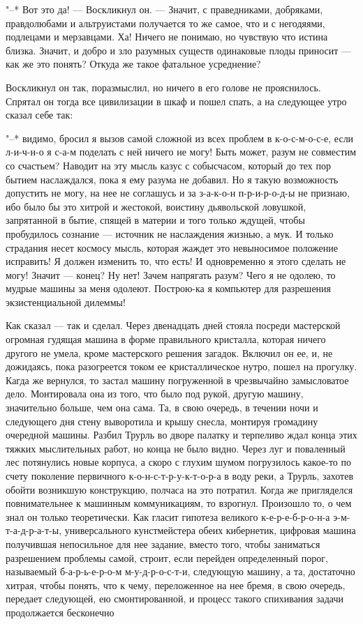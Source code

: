 "--* Вот это да! --- Воскликнул он. --- Значит, с
праведниками, добряками, правдолюбами и альтруистами
получается то же самое, что и с негодяями, подлецами и
мерзавцами. Ха! Ничего не понимаю, но чувствую что истина
близка. Значит, и добро и зло разумных существ одинаковые
плоды приносит --- как же это понять? Откуда же такое
фатальное усреднение?

Воскликнул он так, поразмыслил, но ничего в его голове не
прояснилось. Спрятал он тогда все цивилизации в шкаф и пошел
спать, а на следующее утро сказал себе так:

"--* видимо, бросил я вызов самой сложной из всех проблем в
к-о-с-м-о-с-е, если л-и-ч-н-о я с-а-м поделать с ней ничего
не могу! Быть может, разум не совместим со счастьем? Наводит
на эту мысль казус с собысчасом, который до тех пор бытием
наслаждался, пока я ему разума не добавил. Но я такую
возможность допустить не могу, на нее не соглашусь и за
з-а-к-о-н п-р-и-р-о-д-ы не признаю, ибо было бы это хитрой и
жестокой, воистину дьявольской ловушкой, запрятанной в
бытие, спящей в материи и того только ждущей, чтобы
пробудилось сознание --- источник не наслаждения жизнью, а
мук. И только страдания несет космосу мысль, которая жаждет
это невыносимое положение исправить! Я должен изменить то,
что есть! И одновременно я этого сделать не могу! Значит --- конец?
Ну нет! Зачем напрягать разум? Чего я не одолею, то
мудрые машины за меня одолеют. Построю-ка я компьютер для
разрешения экзистенциальной дилеммы!

Как сказал --- так и сделал. Через двенадцать дней стояла
посреди мастерской огромная гудящая машина в форме
правильного кристалла, которая ничего другого не умела,
кроме мастерского решения загадок. Включил он ее, и, не
дожидаясь, пока разогреется током ее кристаллическое нутро,
пошел на прогулку. Кагда же вернулся, то застал машину
погруженной в чрезвычайно замысловатое дело. Монтировала она
из того, что было под рукой, другую машину, значительно
больше, чем она сама. Та, в свою очередь, в течении ночи и
следующего дня стену выворотила и крышу снесла, монтируя
громадину очередной машины. Разбил Трурль во дворе палатку и
терпеливо ждал конца этих тяжких мыслительных работ, но
конца не было видно. Через луг и поваленный лес потянулись
новые корпуса, а скоро с глухим шумом погрузилось какое-то
по счету поколение первичного к-о-н-с-т-р-у-к-т-о-р-а в воду
реки, а Трурль, захотев обойти возникшую конструкцию,
полчаса на это потратил. Когда же пригляделся повнимательнее
к машинным коммуникациям, то взрогнул. Произошло то, о чем
знал он только теоретически. Как гласит гипотеза великого
к-е-р-е-б-р-о-н-а э-м-т-а-д-р-а-т-ы, универсального
кунстмейстера обеих кибернетик, цифровая машина получившая
непосильное для нее задание, вместо того, чтобы заниматься
разрешением проблемы самой, строит, если перейден
определенный порог, называемый б-а-р-ь-е-р-о-м
м-у-д-р-о-с-т-и, следующую машину, а та, достаточно хитрая,
чтобы понять, что к чему, переложенное на нее бремя, в свою
очередь, передает следующей, ею смонтированной, и процесс
такого спихивания задачи продолжается бесконечно

